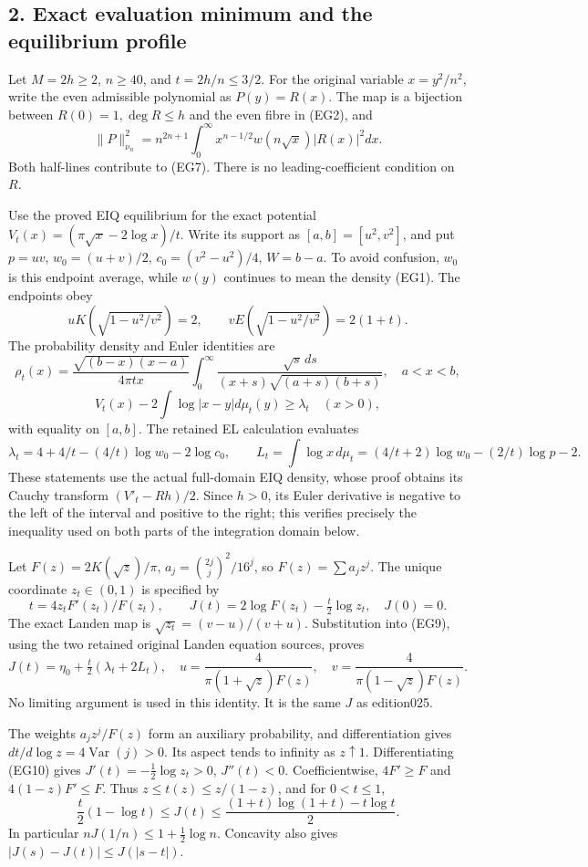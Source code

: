 \documentclass[10pt]{article}
\begin{document}
\subsection{2. Exact evaluation minimum and the equilibrium profile}\label{exact-evaluation-minimum-and-the-equilibrium-profile}

Let \(M=2h\ge2\), \(n\ge40\), and \(t=2h/n\le3/2\). For the original variable \(x=y^2/n^2\), write the even admissible polynomial as \(P(y)=R(x)\). The map is a bijection between \(R(0)=1,\deg R\le h\) and the even fibre in (EG2), and \[
 \|P\|_{\nu_n}^2
 =n^{2n+1}\int_0^\infty x^{n-1/2}w(n\sqrt x)|R(x)|^2dx.
 \tag{EG7}
\] Both half-lines contribute to (EG7). There is no leading-coefficient condition on \(R\).

Use the proved EIQ equilibrium for the exact potential \(V_t(x)=(\pi\sqrt x-2\log x)/t\). Write its support as \([a,b]=[u^2,v^2]\), and put \(p=uv\), \(w_0=(u+v)/2\), \(c_0=(v^2-u^2)/4\), \(W=b-a\). To avoid confusion, \(w_0\) is this endpoint average, while \(w(y)\) continues to mean the density (EG1). The endpoints obey \[
 uK(\sqrt{1-u^2/v^2})=2,\qquad
 vE(\sqrt{1-u^2/v^2})=2(1+t).
\] The probability density and Euler identities are \[
 \rho_t(x)=\frac{\sqrt{(b-x)(x-a)}}{4\pi t x}
 \int_0^\infty\frac{\sqrt s\,ds}{(x+s)\sqrt{(a+s)(b+s)}},
 \quad a<x<b,
 \tag{EG8}
\] \[
 V_t(x)-2\int\log|x-y|d\mu_t(y)\ge\lambda_t
 \quad(x>0),
\] with equality on \([a,b]\). The retained EL calculation evaluates \[
 \lambda_t=4+4/t-(4/t)\log w_0-2\log c_0,
 \qquad L_t=\int\log x\,d\mu_t
 =(4/t+2)\log w_0-(2/t)\log p-2.
 \tag{EG9}
\] These statements use the actual full-domain EIQ density, whose proof obtains its Cauchy transform \((V'_t-Rh)/2\). Since \(h>0\), its Euler derivative is negative to the left of the interval and positive to the right; this verifies precisely the inequality used on both parts of the integration domain below.

Let \(F(z)=2K(\sqrt z)/\pi\), \(a_j=\binom{2j}{j}^2/16^j\), so \(F(z)=\sum a_jz^j\). The unique coordinate \(z_t\in(0,1)\) is specified by \[
 t=4z_tF'(z_t)/F(z_t),\qquad
 J(t)=2\log F(z_t)-\tfrac t2\log z_t,
 \quad J(0)=0.
 \tag{EG10}
\] The exact Landen map is \(\sqrt{z_t}=(v-u)/(v+u)\). Substitution into (EG9), using the two retained original Landen equation sources, proves \[
 J(t)=\eta_0+\tfrac t2(\lambda_t+2L_t),
 \quad
 u=\frac4{\pi(1+\sqrt z)F(z)},\quad
 v=\frac4{\pi(1-\sqrt z)F(z)}.
 \tag{EG11}
\] No limiting argument is used in this identity. It is the same \(J\) as edition025.

The weights \(a_jz^j/F(z)\) form an auxiliary probability, and differentiation gives \(d t/d\log z=4\operatorname{Var}(j)>0\). Its aspect tends to infinity as \(z\uparrow1\). Differentiating (EG10) gives \(J'(t)=-\tfrac12\log z_t>0\), \(J''(t)<0\). Coefficientwise, \(4F'\ge F\) and \(4(1-z)F'\le F\). Thus \(z\le t(z)\le z/(1-z)\), and for \(0<t\le1\), \[
 \frac t2(1-\log t)\le J(t)
 \le\frac{(1+t)\log(1+t)-t\log t}{2}.
 \tag{EG12}
\] In particular \(nJ(1/n)\le1+\tfrac12\log n\). Concavity also gives \(|J(s)-J(t)|\le J(|s-t|)\).
\end{document}
